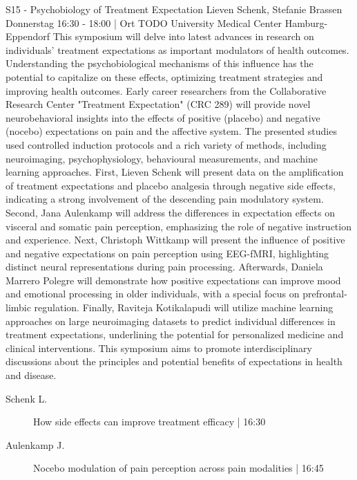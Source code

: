 
            \begin{symposium}
            {S15 - Psychobiology of Treatment Expectation }
            { Lieven Schenk, Stefanie Brassen}
            {Donnerstag 16:30 - 18:00 | Ort TODO}
            {University Medical Center Hamburg-Eppendorf}
            This symposium will delve into latest advances in research on individuals’ treatment expectations as important modulators of health outcomes. Understanding the psychobiological mechanisms of this influence has the potential to capitalize on these effects, optimizing treatment strategies and improving health outcomes. Early career researchers from the Collaborative Research Center "Treatment Expectation" (CRC 289) will provide novel neurobehavioral insights into the effects of positive (placebo) and negative (nocebo) expectations on pain and the affective system. The presented studies used controlled induction protocols and a rich variety of methods, including neuroimaging, psychophysiology, behavioural measurements, and machine learning approaches.
First, Lieven Schenk will present data on the amplification of treatment expectations and placebo analgesia through negative side effects, indicating a strong involvement of the descending pain modulatory system. Second, Jana Aulenkamp will address the differences in expectation effects on visceral and somatic pain perception, emphasizing the role of negative instruction and experience. Next, Christoph Wittkamp will present the influence of positive and negative expectations on pain perception using EEG-fMRI, highlighting distinct neural representations during pain processing. Afterwards, Daniela Marrero Polegre will demonstrate how positive expectations can improve mood and emotional processing in older individuals, with a special focus on prefrontal-limbic regulation. Finally, Raviteja Kotikalapudi will utilize machine learning approaches on large neuroimaging datasets to predict individual differences in treatment expectations, underlining the potential for personalized medicine and clinical interventions.
This symposium aims to promote interdisciplinary discussions about the principles and potential benefits of expectations in health and disease.
            \begin{description}    
            
                \item [ Schenk L.] How side effects can improve treatment efficacy \textcolor{mygray}{ | 16:30}    
                
                \item [ Aulenkamp J.] Nocebo modulation of pain perception across pain modalities \textcolor{mygray}{ | 16:45}    
                

\end{description}
\end{symposium}
